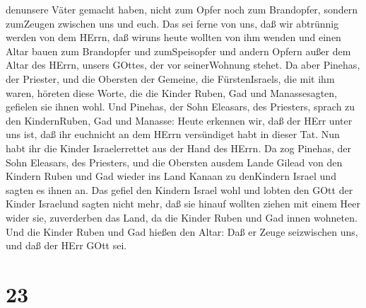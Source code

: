 denunsere Väter gemacht haben, nicht zum Opfer noch zum Brandopfer,
sondern zumZeugen zwischen uns und euch.  Das sei ferne von
uns, daß wir abtrünnig werden von dem HErrn, daß wiruns heute wollten
von ihm wenden und einen Altar bauen zum Brandopfer und zumSpeisopfer
und andern Opfern außer dem Altar des HErrn, unsers GOttes, der vor
seinerWohnung stehet.  Da aber Pinehas, der Priester, und
die Obersten der Gemeine, die FürstenIsraels, die mit ihm waren, höreten
diese Worte, die die Kinder Ruben, Gad und Manassesagten, gefielen sie
ihnen wohl.  Und Pinehas, der Sohn Eleasars, des Priesters,
sprach zu den KindernRuben, Gad und Manasse: Heute erkennen wir, daß der
HErr unter uns ist, daß ihr euchnicht an dem HErrn versündiget habt in
dieser Tat. Nun habt ihr die Kinder Israelerrettet aus der Hand des
HErrn.  Da zog Pinehas, der Sohn Eleasars, des Priesters,
und die Obersten ausdem Lande Gilead von den Kindern Ruben und Gad
wieder ins Land Kanaan zu denKindern Israel und sagten es ihnen an.
 Das gefiel den Kindern Israel wohl und lobten den GOtt der
Kinder Israelund sagten nicht mehr, daß sie hinauf wollten ziehen mit
einem Heer wider sie, zuverderben das Land, da die Kinder Ruben und Gad
innen wohneten.  Und die Kinder Ruben und Gad hießen den
Altar: Daß er Zeuge seizwischen uns, und daß der HErr GOtt sei.

\hypertarget{section-22}{%
\section{23}\label{section-22}}

